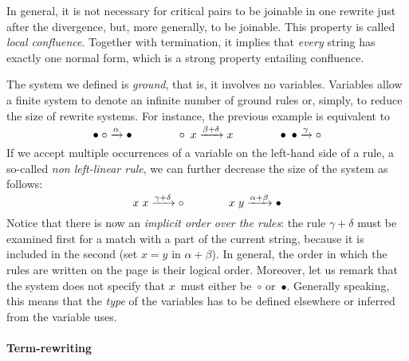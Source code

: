 In general, it is not necessary for critical pairs to be joinable in
one rewrite just after the divergence, but, more generally, to be
joinable. This property is called \emph{local
  confluence}. Together
with termination, it implies that \emph{every} string has exactly one
normal form, which is a strong property entailing confluence.

The system we defined is \emph{ground}, that is, it involves no variables. Variables allow a finite
system to denote an infinite number of ground rules or, simply, to
reduce the size of rewrite systems. For instance, the previous example
is equivalent to
\begin{equation*}
\bullet \; \circ \xrightarrow{\smash{\alpha}} \bullet
\qquad\qquad
\circ \; x \xrightarrow{\smash{\beta+\delta}} x
\qquad\qquad
\bullet \; \bullet \xrightarrow{\smash{\gamma}} \circ
\end{equation*}
If we accept multiple occurrences of a variable on the left\hyp{}hand
side of a rule, a so\hyp{}called \emph{non left\hyp{}linear
  rule}, we can further decrease
the size of the system as follows:
\begin{equation*}
x  \; x \xrightarrow{\smash{\gamma+\delta}} \circ\qquad\qquad
x  \; y \xrightarrow{\smash{\alpha+\beta}} \bullet
\end{equation*}
Notice that there is now an \emph{implicit order over the rules}: the
rule \(\gamma+\delta\) must be examined first for a match with a part
of the current string, because it is included in the second (set
\(x=y\) in \(\alpha+\beta\)). In general, the order in which the rules
are written on the page is their logical order. Moreover, let us
remark that the system does not specify that \(x\)~must either
be~\(\circ\) or~\(\bullet\). Generally speaking, this means that the
\emph{type} of the variables has to be defined elsewhere or inferred
from the variable uses.

\paragraph{Term-rewriting}

